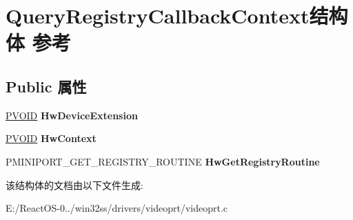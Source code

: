\hypertarget{struct_query_registry_callback_context}{}\section{Query\+Registry\+Callback\+Context结构体 参考}
\label{struct_query_registry_callback_context}
\subsection*{Public 属性}
\begin{DoxyCompactItemize}
\item 
\mbox{\label{struct_query_registry_callback_context_a1a2d6ee32c28a996a2ee51055864f1fb}} 
\hyperlink{interfacevoid}{P\+V\+O\+ID} {\bfseries Hw\+Device\+Extension}
\item 
\mbox{\label{struct_query_registry_callback_context_a9242c967c1518fbb84336a505ead6240}} 
\hyperlink{interfacevoid}{P\+V\+O\+ID} {\bfseries Hw\+Context}
\item 
\mbox{\label{struct_query_registry_callback_context_afacf607b6a7433888dfc7ec27d428c60}} 
P\+M\+I\+N\+I\+P\+O\+R\+T\+\_\+\+G\+E\+T\+\_\+\+R\+E\+G\+I\+S\+T\+R\+Y\+\_\+\+R\+O\+U\+T\+I\+NE {\bfseries Hw\+Get\+Registry\+Routine}
\end{DoxyCompactItemize}


该结构体的文档由以下文件生成\+:\begin{DoxyCompactItemize}
\item 
E\+:/\+React\+O\+S-\/0../win32ss/drivers/videoprt/videoprt.\+c\end{DoxyCompactItemize}
